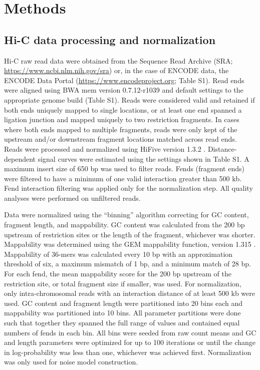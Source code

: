 \section{Methods}

\subsection{Hi-C data processing and normalization}

Hi-C raw read data were obtained from the Sequence Read Archive (SRA; \url{https://www.ncbi.nlm.nih.gov/sra}) or, in the case of ENCODE data, the ENCODE Data Portal (\url{https://www.encodeproject.org}; Table S1). Read ends were aligned using BWA mem version 0.7.12-r1039 and default settings \cite{li_sequence_2009} to the appropriate genome build (Table S1). Reads were considered valid and retained if both ends uniquely mapped to single locations, or at least one end spanned a ligation junction and mapped uniquely to two restriction fragments. In cases where both ends mapped to multiple fragments, reads were only kept of the upstream and/or downstream fragment locations matched across read ends. Reads were processed and normalized using HiFive version 1.3.2 \cite{sauria_hifive:_2015}. Distance-dependent signal curves were estimated using the settings shown in Table S1. A maximum insert size of 650 bp was used to filter reads. Fends (fragment ends) were filtered to have a minimum of one valid interaction greater than 500 kb. Fend interaction filtering was applied only for the normalization step. All quality analyses were performed on unfiltered reads.

Data were normalized using the ``binning'' algorithm correcting for GC content, fragment length, and mappability. GC content was calculated from the 200 bp upstream of restriction sites or the length of the fragment, whichever was shorter. Mappability was determined using the GEM mappability function, version 1.315 \cite{koehler_uniqueome:_2011}. Mappability of 36-mers was calculated every 10 bp with an approximation threshold of six, a maximum mismatch of 1 bp, and a minimum match of 28 bp. For each fend, the mean mappability score for the 200 bp upstream of the restriction site, or total fragment size if smaller, was used. For normalization, only intra-chromosomal reads with an interaction distance of at least 500 kb were used. GC content and fragment length were partitioned into 20 bins each and mappability was partitioned into 10 bins. All parameter partitions were done such that together they spanned the full range of values and contained equal numbers of fends in each bin. All bins were seeded from raw count means and GC and length parameters were optimized for up to 100 iterations or until the change in log-probability was less than one, whichever was achieved first. Normalization was only used for noise model construction.

